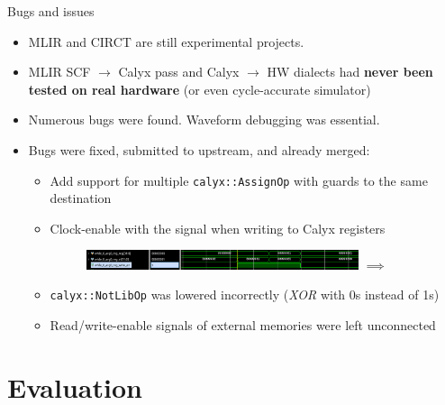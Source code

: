 \documentclass[8pt,a4paper,oneside,hidelinks,aspectratio=169,dvipsnames]{beamer}
\newcommand{\code}[1]{\texttt{\detokenize{#1}}}
\newcommand{\codecpp}[1]{\texttt{#1}}
\begin{document}
\begin{frame}[fragile]{Bugs and issues}
  \begin{itemize}
    \item MLIR and CIRCT are still experimental projects.
    \item MLIR SCF $\rightarrow$ Calyx pass and Calyx $\rightarrow$ HW dialects had \textbf{never been tested on real hardware} (or even cycle-accurate simulator)
    \item Numerous bugs were found. Waveform debugging was essential.
    \item Bugs were fixed, submitted to upstream, and already merged:
          \begin{itemize}
            \item Add support for multiple \codecpp{calyx::AssignOp} with guards to the same destination
                  \begin{figure}
                    \scalebox{.5}{}
                  \end{figure}
            \item Clock-enable with the \code{done} signal when writing to Calyx registers
                  \begin{figure}[H]
                    \centering
                    \includegraphics[width=8cm,valign=b]{img/bug_write_en_done.png}
                    $\implies$
                  \end{figure}
            \item \codecpp{calyx::NotLibOp} was lowered incorrectly (\textit{XOR} with 0s instead of 1s)
            \item Read/write-enable signals of external memories were left unconnected
          \end{itemize}
  \end{itemize}
\end{frame}

\section{Evaluation}
\end{document}
